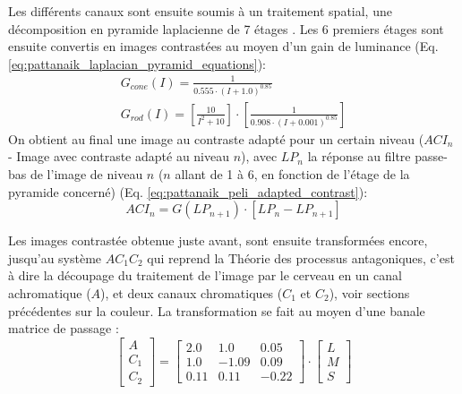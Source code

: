 	\par Les différents canaux sont ensuite soumis à un traitement spatial, une décomposition en pyramide laplacienne de 7 étages \citep{burt_laplacian_1983}. Les 6 premiers étages sont ensuite convertis en images contrastées \citep{peli_contrast_1990} au moyen d'un gain de luminance (Eq. \ref{eq:pattanaik_laplacian_pyramid_equations}):
	\begin{equation}
		\begin{array}{c}
		G_{cone}(I) = \frac{1}{0.555 \cdot (I+1.0)^{0.85}}\\
		G_{rod}(I) = \left[ \frac{10}{I^2+10} \right] \cdot \left[ \frac{1}{0.908 \cdot (I+0.001)^{0.85}} \right]
		\end{array}
		\label{eq:pattanaik_laplacian_pyramid_equations}
	\end{equation}
	On obtient au final une image au contraste adapté pour un certain niveau ($ACI_n$ - Image avec contraste adapté au niveau $n$), avec $LP_n$ la réponse au filtre passe-bas de l'image de niveau $n$ ($n$ allant de 1 à 6, en fonction de l'étage de la pyramide concerné) (Eq. \ref{eq:pattanaik_peli_adapted_contrast}):
	\begin{equation}
		ACI_n = G(LP_{n+1}) \cdot \left[ LP_n - LP_{n+1} \right]
		\label{eq:pattanaik_peli_adapted_contrast}
	\end{equation}
	
	\par Les images contrastée obtenue juste avant, sont ensuite transformées encore, jusqu'au système $AC_1C_2$ qui reprend la Théorie des processus antagoniques, c'est à dire la découpage du traitement de l'image par le cerveau en un canal achromatique ($A$), et deux canaux chromatiques ($C_1$ et $C_2$), voir sections précédentes sur la couleur. La transformation se fait au moyen d'une banale matrice de passage \citep{hunt_reproduction_1995,fairchild_color_1998}:
	\begin{equation}
		\left[ \begin{array}{c}A\\ C_1\\ C_2\end{array} \right] = \left[ \begin{array}{ccc}
		2.0 & 1.0 & 0.05\\
		1.0 & -1.09 & 0.09\\
		0.11 & 0.11 & -0.22		
		\end{array} \right] \cdot \left[ \begin{array}{c}L\\ M\\ S\end{array} \right]
		\label{eq:pattanaik_linear_transform_lms_to_ac1c2}
	\end{equation}
	
